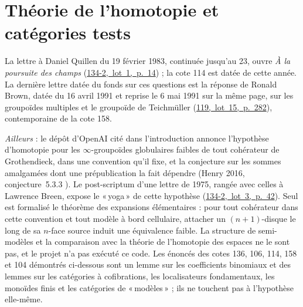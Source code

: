 \documentclass[11pt]{article}
\newcommand{\q}[1]{«\,#1\,»}
\newcommand{\lot}[3]{\mbox{\href{https://grothendieck.commutator.io/\##1/#2/p#3}{#1, lot #2, p.~#3}}}
\newcommand{\lettres}[1]{{\small #1\par}\medskip}
\newcommand{\ailleurs}[1]{{\small\textit{Ailleurs} : #1\par}\medskip}
\theoremstyle{plain}
\theoremstyle{definition}
\theoremstyle{plain}
\theoremstyle{definition}
\theoremstyle{remark}
\renewcommand{\_}{\bkunderscore\allowbreak}
\begin{document}
\part{Théorie de l'homotopie et catégories tests}
\lettres{La lettre à Daniel Quillen du 19 février 1983, continuée jusqu'au 23, ouvre \emph{À la poursuite des champs} (\lot{134-2}{1}{14}) ; la cote 114 est datée de cette année. La dernière lettre datée du fonds sur ces questions est la réponse de Ronald Brown, datée du 16 avril 1991 et reprise le 6 mai 1991 sur la même page, sur les groupoïdes multiples et le groupoïde de Teichmüller (\lot{119}{15}{282}), contemporaine de la cote 158.}
\ailleurs{le dépôt d'OpenAI cité dans l'introduction annonce l'hypothèse d'homotopie pour les $\infty$-groupoïdes globulaires faibles de tout cohérateur de Grothendieck, dans une convention qu'il fixe, et la conjecture sur les sommes amalgamées dont une prépublication la fait dépendre (Henry 2016, conjecture~5.3.3 \cite{henry2016}). Le post-scriptum d'une lettre de 1975, rangée avec celles à Lawrence Breen, expose le \q{yoga} de cette hypothèse (\lot{134-2}{3}{42}). Seul est formalisé le théorème des expansions élémentaires : pour tout cohérateur dans cette convention et tout modèle à bord cellulaire, attacher un $(n+1)$-disque le long de sa $n$-face source induit une équivalence faible. La structure de semi-modèles et la comparaison avec la théorie de l'homotopie des espaces ne le sont pas, et le projet n'a pas exécuté ce code. Les énoncés des cotes 136, 106, 114, 158 et 104 démontrés ci-dessous sont un lemme sur les coefficients binomiaux et des lemmes sur les catégories à cofibrations, les localisateurs fondamentaux, les monoïdes finis et les catégories de \q{modèles} ; ils ne touchent pas à l'hypothèse elle-même.}
\end{document}
